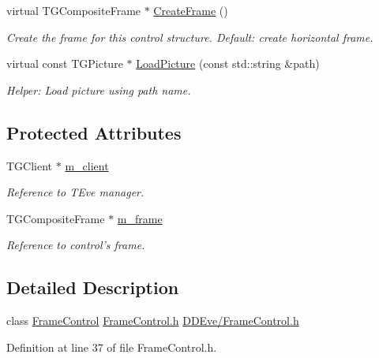 \begin{DoxyCompactItemize}
virtual TGCompositeFrame $\ast$ \hyperlink{class_d_d4hep_1_1_frame_control_a3622593e0da13ddc3719d845782ec7be}{CreateFrame} ()
\begin{DoxyCompactList}\small\item\em Create the frame for this control structure. Default: create horizontal frame. \item\end{DoxyCompactList}\item 
virtual const TGPicture $\ast$ \hyperlink{class_d_d4hep_1_1_frame_control_a9c86d20503c0dcf96f5a13bced00ecc0}{LoadPicture} (const std::string \&path)
\begin{DoxyCompactList}\small\item\em Helper: Load picture using path name. \item\end{DoxyCompactList}\end{DoxyCompactItemize}
\subsection*{Protected Attributes}
\begin{DoxyCompactItemize}
\item 
TGClient $\ast$ \hyperlink{class_d_d4hep_1_1_frame_control_aaca4e5ed19a1982777f7d19bb7dd6a6b}{m\_\-client}
\begin{DoxyCompactList}\small\item\em Reference to TEve manager. \item\end{DoxyCompactList}\item 
TGCompositeFrame $\ast$ \hyperlink{class_d_d4hep_1_1_frame_control_aae98fb770d6e50d5df6ed082cd5118ac}{m\_\-frame}
\begin{DoxyCompactList}\small\item\em Reference to control's frame. \item\end{DoxyCompactList}\end{DoxyCompactItemize}


\subsection{Detailed Description}
class \hyperlink{class_d_d4hep_1_1_frame_control}{FrameControl} \hyperlink{_frame_control_8h}{FrameControl.h} \hyperlink{_frame_control_8h}{DDEve/FrameControl.h} 

Definition at line 37 of file FrameControl.h.

